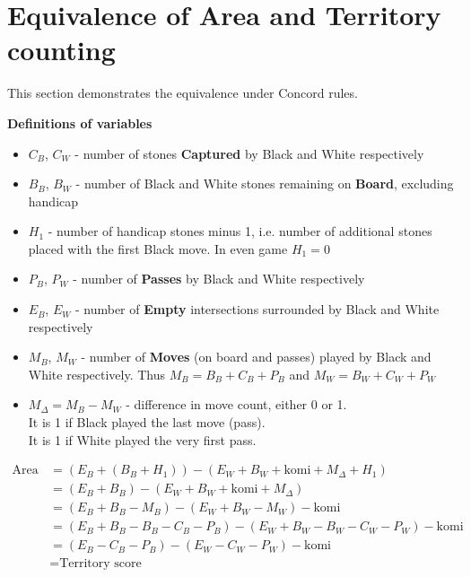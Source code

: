 \documentclass[11pt]{article}
\begin{document}
\newpage
\section{Equivalence of Area and Territory counting}

This section demonstrates the equivalence under Concord rules.

\textbf{Definitions of variables}

\begin{itemize}
\item $C_B$, $C_W$ - number of stones \textbf{Captured} by Black and White respectively
\item $B_B$, $B_W$ - number of Black and White stones remaining on \textbf{Board}, excluding handicap
\item $H_1$ - number of handicap stones minus 1, i.e. number of additional stones placed with the first Black move.
In even game $H_1 = 0$
\item $P_B$, $P_W$ - number of \textbf{Passes} by Black and White respectively
\item $E_B$, $E_W$ - number of \textbf{Empty} intersections surrounded by Black and White respectively
\item $M_B$, $M_W$ - number of \textbf{Moves} (on board and passes) played by Black and White respectively.
Thus $M_B = B_B + C_B + P_B$ and $M_W = B_W + C_W + P_W$
\item $M_\Delta = M_B - M_W$ - difference in move count, either 0 or 1. \\
It is 1 if Black played the last move (pass).\\
It is 1 if White played the very first pass.
\end{itemize}

\begin{align}
\text{Area score} &= (E_B + (B_B+H_1)) - (E_W + B_W + \text{komi} + M_\Delta + H_1) \\
&= (E_B + B_B) - (E_W + B_W + \text{komi} + M_\Delta) \\
&= (E_B + B_B - M_B) - (E_W + B_W - M_W) - \text{komi} \\
&= (E_B + B_B - B_B - C_B - P_B ) - (E_W + B_W - B_W - C_W - P_W) - \text{komi} \\
&= (E_B - C_B - P_B) - (E_W - C_W - P_W) - \text{komi} \\
&= \text{Territory score}
\end{align}
\end{document}
